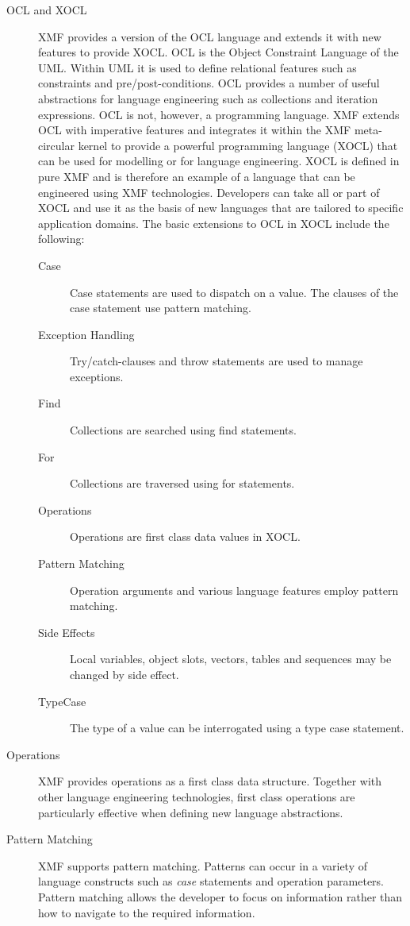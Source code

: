 \documentclass{article}
\begin{document}
\begin{description}
\item[OCL and XOCL]
XMF provides a version of the OCL language and extends it with new features to
provide XOCL. OCL is the Object Constraint Language of the UML. Within UML it is used
to define relational features such as constraints and pre/post-conditions. OCL
provides a number of useful abstractions for language engineering such as collections
and iteration expressions. OCL is not, however, a programming language. XMF extends
OCL with imperative features and integrates it within the XMF meta-circular kernel
to provide a powerful programming language (XOCL) that can be used for modelling or for
language engineering. XOCL is defined in pure XMF and is therefore an example of 
a language that can be engineered using XMF technologies. Developers can take all
or part of XOCL and use it as the basis of new languages that are tailored to 
specific application domains. The basic extensions to OCL in XOCL include the following:
\begin{description}
\item[Case] Case statements are used to dispatch on a value. The clauses of the case statement
use pattern matching.
\item[Exception Handling] Try/catch-clauses and throw statements are used to manage exceptions.
\item[Find] Collections are searched using find statements. 
\item[For] Collections are traversed using for statements.
\item[Operations] Operations are first class data values in XOCL.
\item[Pattern Matching] Operation arguments and various language features employ pattern matching.
\item[Side Effects] Local variables, object slots, vectors, tables and sequences may be
changed by side effect.
\item[TypeCase] The type of a value can be interrogated using a type case statement.
\end{description}

\item[Operations]
XMF provides operations as a first class data structure. Together with other language
engineering technologies, first class operations are particularly effective when
defining new language abstractions.

\item[Pattern Matching]
XMF supports pattern matching. Patterns can occur in a variety of
language constructs such as {\em case} statements and operation parameters.
Pattern matching allows the developer to focus on information rather than
how to navigate to the required information.


\end{description}
\end{document}
